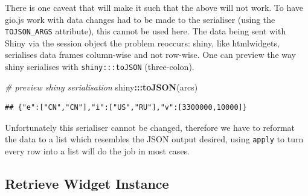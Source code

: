 \documentclass[
]{krantz}
\makeatletter
\newenvironment{Shaded}{\begin{snugshade}}{\end{snugshade}}
\newcommand{\CommentTok}[1]{\textcolor[rgb]{0.37,0.37,0.37}{\textit{#1}}}
\newcommand{\ControlFlowTok}[1]{\textcolor[rgb]{0.27,0.27,0.27}{\textbf{#1}}}
\newcommand{\DataTypeTok}[1]{\textcolor[rgb]{0.27,0.27,0.27}{#1}}
\newcommand{\DecValTok}[1]{\textcolor[rgb]{0.06,0.06,0.06}{#1}}
\newcommand{\KeywordTok}[1]{\textcolor[rgb]{0.27,0.27,0.27}{\textbf{#1}}}
\newcommand{\NormalTok}[1]{#1}
\newcommand{\OperatorTok}[1]{\textcolor[rgb]{0.43,0.43,0.43}{\textbf{#1}}}
\newcommand{\StringTok}[1]{\textcolor[rgb]{0.5,0.5,0.5}{#1}}
\newenvironment{kframe}{%
\medskip{}
\setlength{\fboxsep}{.8em}
 \def\at@end@of@kframe{}%
 \ifinner\ifhmode%
  \def\at@end@of@kframe{\end{minipage}}%
  \begin{minipage}{\columnwidth}%
 \fi\fi%
 \def\FrameCommand##1{\hskip\@totalleftmargin \hskip-\fboxsep
 \colorbox{shadecolor}{##1}\hskip-\fboxsep
     \hskip-\linewidth \hskip-\@totalleftmargin \hskip\columnwidth}%
 \MakeFramed {\advance\hsize-\width
   \@totalleftmargin\z@ \linewidth\hsize
   \@setminipage}}%
 {\par\unskip\endMakeFramed%
 \at@end@of@kframe}
\renewenvironment{Shaded}{\begin{kframe}}{\end{kframe}}
\makeatother
\begin{document}
There is one caveat that will make it such that the above will not work. To have gio.js work with data changes had to be made to the serialiser (using the \texttt{TOJSON\_ARGS} attribute), this cannot be used here. The data being sent with Shiny via the session object the problem reoccurs: shiny, like htmlwidgets, serialises data frames column-wise and not row-wise. One can preview the way shiny serialises with \texttt{shiny:::toJSON} (three-colon).

\begin{Shaded}
\begin{Highlighting}[]
\CommentTok{\# preview shiny serialisation}
\NormalTok{shiny}\OperatorTok{:::}\KeywordTok{toJSON}\NormalTok{(arcs)}
\end{Highlighting}
\end{Shaded}

\begin{verbatim}
## {"e":["CN","CN"],"i":["US","RU"],"v":[3300000,10000]}
\end{verbatim}

Unfortunately this serialiser cannot be changed, therefore we have to reformat the data to a list which resembles the JSON output desired, using \texttt{apply} to turn every row into a list will do the job in most cases.

\begin{Shaded}
\end{Shaded}

\hypertarget{retrieve-widget-instance}{%
\subsection{Retrieve Widget Instance}\label{retrieve-widget-instance}}
\end{document}
